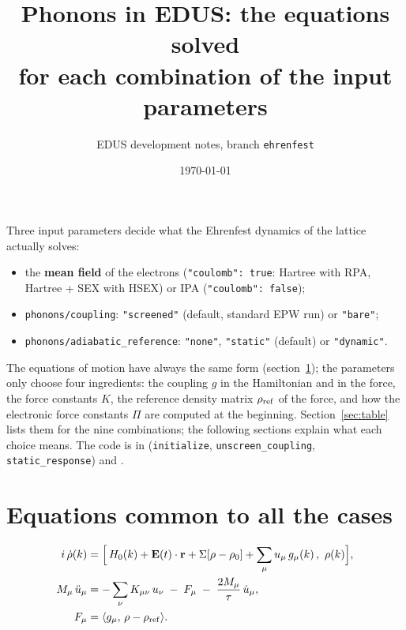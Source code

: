 \documentclass[11pt]{article}
\title{Phonons in EDUS: the equations solved\\ for each combination of the input parameters}
\author{EDUS development notes, branch \texttt{ehrenfest}}
\date{\today}
\newcommand{\inner}[2]{\langle #1,\,#2\rangle}
\begin{document}
\maketitle

\noindent Three input parameters decide what the Ehrenfest dynamics of the lattice actually solves:
\begin{itemize}
\item the \textbf{mean field} of the electrons (\texttt{"coulomb": true}: Hartree with RPA, Hartree + SEX with HSEX) or IPA (\texttt{"coulomb": false});
\item \texttt{phonons/coupling}: \texttt{"screened"} (default, standard EPW run) or \texttt{"bare"};
\item \texttt{phonons/adiabatic\_reference}: \texttt{"none"}, \texttt{"static"} (default) or \texttt{"dynamic"}.
\end{itemize}
The equations of motion have always the same form (section~\ref{sec:common}); the parameters only choose four
ingredients: the coupling $g$ in the Hamiltonian and in the force, the force constants $K$, the reference density
matrix $\rho_{\rm ref}$ of the force, and how the electronic force constants $\Pi$ are computed at the beginning.
Section~\ref{sec:table} lists them for the nine combinations; the following sections explain what each choice means.
The code is in  (\texttt{initialize}, \texttt{unscreen\_coupling},
\texttt{static\_response}) and .

\section{Equations common to all the cases}\label{sec:common}
\begin{align}
i\,\dot\rho(k) &= \Big[\, H_0(k) + \mathbf E(t)\cdot\mathbf r + \Sigma[\rho-\rho_0] + \sum_\mu u_\mu\, g_\mu(k)\,,\ \rho(k) \Big],
\label{eq:rho}\\
M_\mu\,\ddot u_\mu &= -\sum_\nu K_{\mu\nu}\,u_\nu \;-\; F_\mu \;-\; \frac{2M_\mu}{\tau}\,\dot u_\mu ,
\label{eq:lattice}\\
F_\mu &= \inner{g_\mu}{\rho-\rho_{\rm ref}} .
\label{eq:force}
\end{align}
\end{document}
